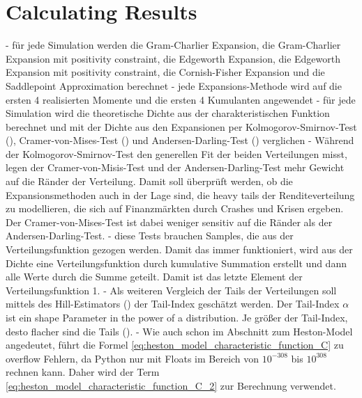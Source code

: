 \section{Calculating Results}
- für jede Simulation werden die Gram-Charlier Expansion, die Gram-Charlier Expansion mit positivity constraint, die Edgeworth Expansion, die Edgeworth Expansion mit positivity constraint, die Cornish-Fisher Expansion und die Saddlepoint Approximation berechnet
- jede Expansions-Methode wird auf die ersten 4 realisierten Momente und die ersten 4 Kumulanten angewendet
- für jede Simulation wird die theoretische Dichte aus der charakteristischen Funktion berechnet und mit der Dichte aus den Expansionen per Kolmogorov-Smirnov-Test (\cite{kolmogorovSullaDeterminazioneEmpirica1993}), Cramer-von-Mises-Test (\cite{vonmisesWahrscheinlichkeitStatistikUnd1928,cramerCompositionElementaryErrors1928,andersonDistributionTwoSampleCramervon1962}) und Andersen-Darling-Test (\cite{andersonTestGoodnessFit1954}) verglichen
- Während der Kolmogorov-Smirnov-Test den generellen Fit der beiden Verteilungen misst, legen der Cramer-von-Misis-Test und der Andersen-Darling-Test mehr Gewicht auf die Ränder der Verteilung. Damit soll überprüft werden, ob die Expansionsmethoden auch in der Lage sind, die heavy tails der Renditeverteilung zu modellieren, die sich auf Finanzmärkten durch Crashes und Krisen ergeben. Der Cramer-von-Mises-Test ist dabei weniger sensitiv auf die Ränder als der Andersen-Darling-Test.
- diese Tests brauchen Samples, die aus der Verteilungsfunktion gezogen werden. Damit das immer funktioniert, wird aus der Dichte eine Verteilungsfunktion durch kumulative Summation erstellt und dann alle Werte durch die Summe geteilt. Damit ist das letzte Element der Verteilungsfunktion 1.
- Als weiteren Vergleich der Tails der Verteilungen soll mittels des Hill-Estimators (\cite{hillSimpleGeneralApproach1975}) der Tail-Index geschätzt werden. Der Tail-Index $\alpha$ ist ein shape Parameter in the power of a distribution. Je größer der Tail-Index, desto flacher sind die Tails (\cite{fischlerAnswerDefinitionTailindex2017,danielssonTailIndexEstimation2016}). 
- Wie auch schon im Abschnitt zum Heston-Model angedeutet, führt die Formel \eqref{eq:heston_model_characteristic_function_C} zu overflow Fehlern, da Python nur mit Floats im Bereich von $10^{-308}$ bis $10^{308}$ rechnen kann. Daher wird der Term \eqref{eq:heston_model_characteristic_function_C_2} zur Berechnung verwendet.